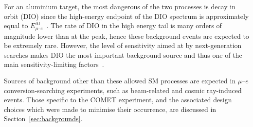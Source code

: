 For an aluminium target, the most dangerous of the two processes is decay in
orbit (DIO) since the high-energy endpoint of the DIO spectrum is approximately
equal to $E^\mathrm{Al}_{\mu\text{--}e}$~\cite{czarnecki}. The rate of DIO in
the high energy tail is many orders of magnitude lower than at the peak, hence
these background events are expected to be extremely rare. However, the level of
sensitivity aimed at by next-generation searches makes DIO the most important
background source and thus one of the main sensitivity-limiting
factors~\cite{the_comet_collaboration_comet_2020}.

Sources of background other than these allowed SM processes are expected in
$\mu$--$e$ conversion-searching experiments, such as beam-related and cosmic
ray-induced events. Those specific to the COMET experiment, and the associated
design choices which were made to minimise their occurrence, are discussed in
Section~\ref{sec:backgrounds}.
















